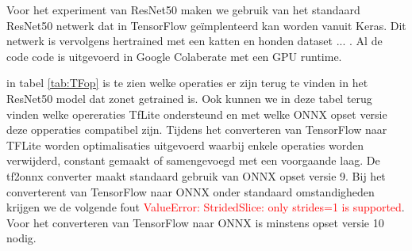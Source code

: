 Voor het experiment van ResNet50 maken we gebruik van het standaard ResNet50 netwerk dat in TensorFlow ge\"implenteerd kan worden vanuit Keras.
Dit netwerk is vervolgens hertrained met een katten en honden dataset ... .
Al de code code is uitgevoerd in Google Colaberate met een GPU runtime.

in tabel \ref{tab:TFop} is te zien welke operaties er zijn terug te vinden in het ResNet50 model dat zonet getrained is.
Ook kunnen we in deze tabel terug vinden welke opereraties TfLite ondersteund en met welke ONNX opset versie deze opperaties compatibel zijn.
Tijdens het converteren van TensorFlow naar TFLite worden optimalisaties uitgevoerd waarbij enkele operaties worden verwijderd, constant gemaakt of samengevoegd met een voorgaande laag.
De tf2onnx converter maakt standaard gebruik van ONNX opset versie 9.
Bij het converterent van TensorFlow naar ONNX onder standaard omstandigheden krijgen we de volgende fout 
\textcolor{red}{ValueError: StridedSlice: only strides=1 is supported}.  
Voor het converteren van TensorFlow naar ONNX is minstens opset versie 10 nodig.

